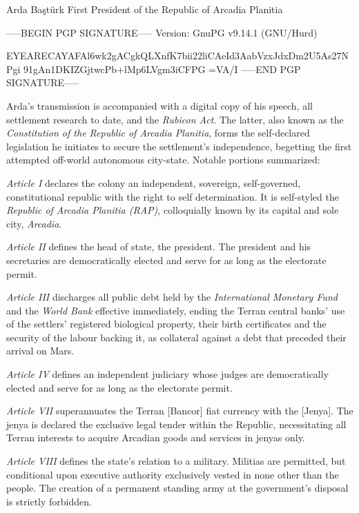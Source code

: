 Arda Baştürk
First President of the Republic of Arcadia Planitia

-----BEGIN PGP SIGNATURE-----
Version: GnuPG v9.14.1 (GNU/Hurd)

EYEARECAYAFAl6wk2gACgkQLXnfK7bii22liCAeId3AabVzxJdxDm2U5As27NPgi
91gAn1DKIZGjtwcPb+lMp6LVgm3iCFPG
=VA/I
-----END PGP SIGNATURE-----

\stopTimelineDocument

Arda's transmission is accompanied with a digital copy of his speech, all settlement research to date, and the {\it Rubicon Act}. The latter, also known as the {\it Constitution of the Republic of Arcadia Planitia}, forms the self-declared legislation he initiates to secure the settlement's independence, begetting the first attempted off-world autonomous city-state. Notable portions summarized:

\startTimelineDocument
\startitemize[5]
\setupwhitespace[big]
\item {\it Article I} declares the colony an independent, sovereign, self-governed, constitutional republic with the right to self determination. It is self-styled the {\it Republic of Arcadia Planitia (RAP)}, colloquially known by its capital and sole city, {\it Arcadia}.

\item {\it Article II} defines the head of state, the president. The president and his secretaries are democratically elected and serve for as long as the electorate permit.

\item {\it Article III} discharges all public debt held by the {\it International Monetary Fund} and the {\it World Bank} effective immediately, ending the Terran central banks' use of the settlers' registered biological property, their birth certificates and the security of the labour backing it, as collateral against a debt that preceded their arrival on Mars.

\item {\it Article IV} defines an independent judiciary whose judges are democratically elected and serve for as long as the electorate permit.

\item {\it Article VII} superannuates the Terran [Bancor] fiat currency with the [Jenya]. The jenya is declared the exclusive legal tender within the Republic, necessitating all Terran interests to acquire Arcadian goods and services in jenyas only.

\item {\it Article VIII} defines the state's relation to a military. Militias are permitted, but conditional upon executive authority exclusively vested in none other than the people. The creation of a permanent standing army at the government's disposal is strictly forbidden.

